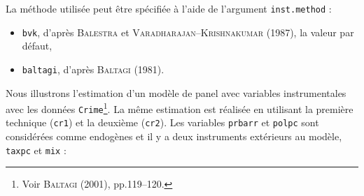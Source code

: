 \documentclass[a4paper]{article}
\begin{document}
La méthode utilisée peut être spécifiée à l'aide de l'argument
\texttt{inst.method} :

\begin{itemize}
\item \texttt{bvk}, d'après \textsc{Balestra} et \textsc{Varadharajan--Krishnakumar} (1987), la valeur par défaut,
\item \texttt{baltagi}, d'après \textsc{Baltagi} (1981).
\end{itemize}

Nous illustrons l'estimation d'un modèle de panel avec variables
instrumentales avec les données \texttt{Crime}\footnote{Voir
  \textsc{Baltagi} (2001), pp.119--120.}. La même estimation est
réalisée en utilisant la première technique (\texttt{cr1}) et la
deuxième (\texttt{cr2}). Les variables \texttt{prbarr} et \texttt{polpc}
sont considérées comme endogènes et il y a deux instruments extérieurs
au modèle,
\texttt{taxpc} et \texttt{mix} :
\end{document}
